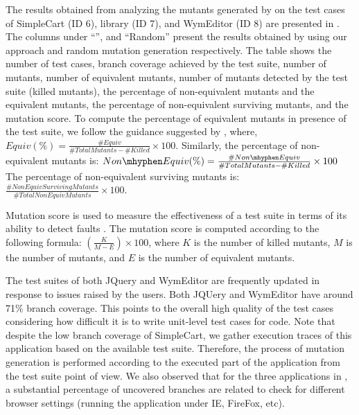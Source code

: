 The results obtained from analyzing the mutants generated by \mutandis on the test cases of SimpleCart (ID 6), \jquery library (ID 7), and WymEditor (ID 8) are presented in . The columns under ``\mutandis'', and ``Random'' present the results obtained by using our approach and random mutation generation respectively. The table shows the number of test cases, branch coverage achieved by the test suite, number of mutants, number of equivalent mutants, number of mutants detected by the test suite (killed mutants), 
the percentage of non-equivalent mutants and the equivalent mutants, 
the percentage of non-equivalent surviving mutants, and the mutation score.
To compute the percentage of equivalent mutants in presence of the test suite, we follow the guidance suggested by \cite{schuler:tvr12}, where, $Equiv (\%)=\frac{\#Equiv}{\#TotalMutants-\#Killed} \times 100$. 
Similarly, the percentage of non-equivalent mutants is: $Non\mhyphen Equiv (\%)=\frac{\#Non\mhyphen Equiv}{\#TotalMutants-\#Killed} \times 100$
The percentage of non-equivalent surviving mutants is: $\frac{\#NonEquivSurvivingMutants}{\#TotalNonEquivMutants} \times 100$.

Mutation score is used to measure the effectiveness of a test suite in terms of its ability
to detect faults \cite{woodward:ist93}. The mutation score is computed according to the following formula: 
$\left(\frac{K}{M-E}\right) \times 100$, where $K$ is the number of killed mutants, $M$ is the  number of mutants, and $E$ is the number of equivalent mutants.    

 The test suites of both JQuery and WymEditor are frequently updated in response to issues raised by the users. Both JQUery and WymEditor have around 71\% branch coverage. This points to the overall high quality of the test cases considering how difficult it is to write unit-level test cases for \javascript code. 
Note that despite the low branch coverage of SimpleCart, we gather execution traces of this application based on the available test suite. Therefore, the process of mutation generation is performed according to the executed part of the application from the test suite point of view. We also observed that for the three applications in , a substantial percentage of uncovered branches are related to check for different browser settings (\ie running the application under IE, FireFox, etc).

